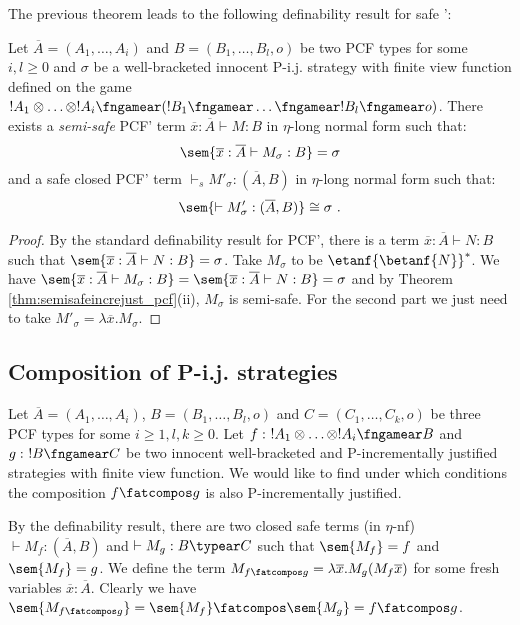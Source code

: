 The previous theorem leads to the following definability result for safe \pcf':
\begin{proposition}
\label{prop:safetydefinability}
Let $\overline{A}=(A_1,\ldots, A_i)$ and $B =(B_1, \ldots, B_l,o)$ be two PCF types for some $i,l\geq 0$ and $\sigma$ be a well-bracketed innocent
P-i.j. strategy with finite view function defined on the game $!A_1 \otimes \ldots \otimes !A_i \fngamear (!B_1 \fngamear \ldots \fngamear !B_l \fngamear o) $. There exists a \emph{semi-safe} PCF' term $\overline{x} : \overline{A} \vdash M : B$ in $\eta$-long normal form such that:
$$ \sem{\overline{x} : \overline{A} \vdash M_\sigma : B} = \sigma $$
and a safe closed PCF' term $\vdash_s M'_\sigma : (\overline{A},B)$ in $\eta$-long normal form such that:
$$ \sem{\vdash M'_\sigma : (\overline{A},B)} \cong \sigma \ .$$
\end{proposition}
\begin{proof}
By the standard definability result for PCF', there is a term $\overline{x} : \overline{A} \vdash N : B$ such that $\sem{\overline{x} :\overline{A} \vdash N : B} = \sigma$.
Take $M_\sigma$ to be $\etanf{\betanf{N}}^* $. We have $\sem{\overline{x} : \overline{A} \vdash M_\sigma : B} =  \sem{\overline{x} :\overline{A} \vdash N : B} = \sigma$ and by Theorem  \ref{thm:semisafeincrejust_pcf}(ii), $M_\sigma$ is semi-safe.
For the second part we just need to take $M'_\sigma = \lambda \overline{x}. M_\sigma$.
\end{proof}


\subsection{Composition of P-i.j. strategies}

Let $\overline{A} = (A_1, \ldots, A_i)$,
$B = (B_1, \ldots, B_l,o)$ 
and $C=(C_1,\ldots,C_k,o)$ be three PCF types
for some $i\geq 1,l,k\geq 0$. Let
$f:\ !A_1 \otimes \ldots \otimes !A_i \fngamear B$ and $g:\ !B\fngamear C$ be two innocent well-bracketed and P-incrementally justified strategies with finite view function.
We would like to find under which conditions the composition $f\fatcompos g$ is also P-incrementally justified.

By the definability result, there are two closed safe terms (in $\eta$-nf) $\vdash M_f :(\overline{A},B)$  and $\vdash M_g :B \typear C$ such that $\sem{M_f} = f$
and $\sem{M_f} = g$.
We define the term $M_{f\fatcompos g} = \lambda \overline{x} . M_g (M_f \overline{x})$ for some fresh variables $\overline{x} : \overline{A}$. Clearly we have $\sem{M_{f\fatcompos g}} = \sem{M_f} \fatcompos \sem{M_g} = f\fatcompos g$.

